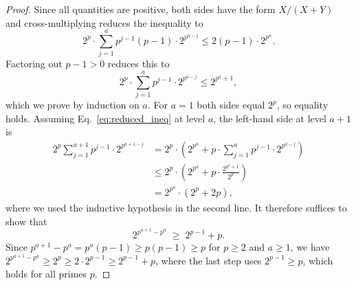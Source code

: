 \documentclass[11pt, reqno]{elsarticle}%
\theoremstyle{plain}
\begin{document}
\begin{proof}
    

Since all quantities are positive, both sides 
have the form $X/(X+Y)$ and cross-multiplying reduces the 
inequality to
\begin{equation}
  2^p\cdot\sum_{j=1}^{a} p^{j-1}(p-1)\cdot 2^{p^{a-j}} 
  \leq 2(p-1)\cdot 2^{p^a}.
\end{equation}
Factoring out $p-1 > 0$ reduces this to
\begin{equation}\label{eq:reduced_ineq}
  2^p\cdot\sum_{j=1}^{a} p^{j-1}\cdot 2^{p^{a-j}} \leq 2^{p^a+1},
\end{equation}
which we prove by induction on $a$. For $a=1$ both sides equal 
$2^p$, so equality holds. Assuming Eq.~\eqref{eq:reduced_ineq} 
at level $a$, the left-hand side at level $a+1$ is
\begin{align}
  2^p\sum_{j=1}^{a+1} p^{j-1}\cdot 2^{p^{a+1-j}}
  &= 2^p\cdot\left(2^{p^a} + p\cdot\sum_{j=1}^{a} 
  p^{j-1}\cdot 2^{p^{a-j}}\right) \nonumber\\
  &\leq 2^p\cdot\left(2^{p^a} + p\cdot 
  \frac{2^{p^a+1}}{2^p}\right) \nonumber\\
  &= 2^{p^a}\cdot\left(2^p + 2p\right),
\end{align}
where we used the inductive hypothesis in the second line. It 
therefore suffices to show that
\begin{equation}
  2^{p^{a+1}-p^a} \;\ge\; 2^{p-1}+p.
  \label{eq:suffices}
\end{equation}
Since $p^{a+1}-p^a = p^a(p-1) \ge p(p-1) \ge p$ for $p\ge 2$ 
and $a \ge 1$, we have $2^{p^{a+1}-p^a} \ge 2^p \ge 2\cdot 
2^{p-1} \ge 2^{p-1}+p$, where the last step uses $2^{p-1}\ge p$, 
which holds for all primes $p$.
\end{proof}
\end{document}
